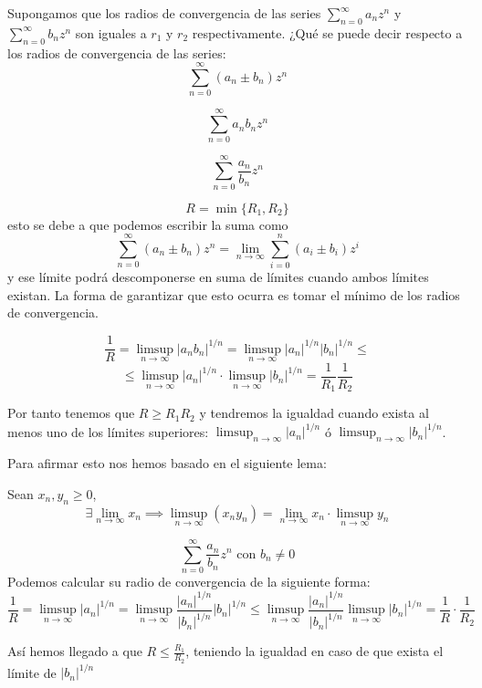 \begin{problem}[13]
Supongamos que los radios de convergencia de las series $\sum_{n=0}^{\infty} a_nz^n$ y $\sum_{n=0}^{\infty}b_nz^n$ son iguales a $r_1$ y $r_2$ respectivamente. ¿Qué se puede decir respecto a los radios de convergencia de las series:
\ppart
\[\sum_{n=0}^{\infty} (a_n\pm b_n)z^n\]

\ppart
\[\sum_{n=0}^{\infty}a_nb_nz^n\]

\ppart
\[\sum_{n=0}^{\infty}\frac{a_n}{b_n}z^n\]

\solution

\spart
\[ R = \min\{R_1, R_2\}\]
esto se debe a que podemos escribir la suma como
\[\sum_{n=0}^{\infty}(a_n\pm b_n)z^n = \lim_{n \to \infty} \sum_{i=0}^n (a_i\pm b_i)z^i\]
y ese límite podrá descomponerse en suma de límites cuando ambos límites existan. La forma de garantizar que esto ocurra es tomar el mínimo de los radios de convergencia.

\spart
\[\frac{1}{R}=\limsup_{ n \to \infty}|a_nb_n|^{1/n} = \limsup_{n\to \infty}|a_n|^{1/n}|b_n|^{1/n} \leq\]
\[\leq \limsup_{n\to \infty} |a_n|^{1/n}\cdot \limsup_{n\to \infty} |b_n|^{1/n} = \frac{1}{R_1}\frac{1}{R_2}\]

Por tanto tenemos que $R \geq R_1R_2$ y tendremos la igualdad cuando exista al menos uno de los límites superiores: $\limsup_{n\to \infty} |a_n|^{1/n}$ ó $\limsup_{n\to \infty}|b_n|^{1/n}$.

Para afirmar esto nos hemos basado en el siguiente lema:
\begin{lemma}
Sean $x_n,y_n \geq 0$,
\[\exists \lim_{n \to \infty} x_n \implies \limsup_{n \to \infty }(x_ny_n)=\lim_{n \to \infty}x_n \cdot \limsup_{n \to \infty} y_n\]
\end{lemma}

\spart
\[\sum_{n = 0}^{\infty} \frac{a_n}{b_n}z^n \text{ con } b_n \neq 0\]
Podemos calcular su radio de convergencia de la siguiente forma:
\[\frac{1}{R}=\limsup_{n \to \infty} |a_n|^{1/n} = \limsup_{n \to \infty} \frac{|a_n|^{1/n}}{|b_n|^{1/n}}|b_n|^{1/n} \leq \limsup_{n \to \infty} \frac{|a_n|^{1/n}}{|b_n|^{1/n}}\limsup_{n \to \infty} |b_n|^{1/n}=\frac{1}{R}\cdot \frac{1}{R_2}\]

Así hemos llegado a que $R \leq \frac{R_1}{R_2}$, teniendo la igualdad en caso de que exista el límite de $|b_n|^{1/n}$


\end{problem}

